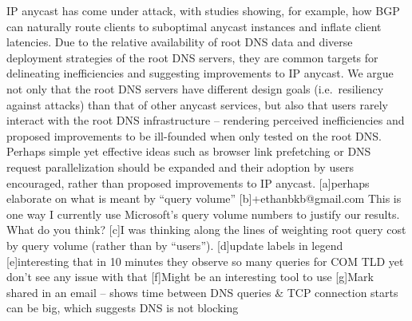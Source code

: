 \documentclass[sigconf,nonacm,10pt]{acmart}
\begin{document}
IP anycast has come under attack, with studies showing, for example, how
BGP can naturally route clients to suboptimal anycast instances and
inflate client latencies. Due to the relative availability of root DNS
data and diverse deployment strategies of the root DNS servers, they are
common targets for delineating inefficiencies and suggesting
improvements to IP anycast. We argue not only that the root DNS servers
have different design goals (i.e.~resiliency against attacks) than that
of other anycast services, but also that users rarely interact with the
root DNS infrastructure -- rendering perceived inefficiencies and
proposed improvements to be ill-founded when only tested on the root
DNS. Perhaps simple yet effective ideas such as browser link prefetching
or DNS request parallelization should be expanded and their adoption by
users encouraged, rather than proposed improvements to IP anycast.
{[}a{]}perhaps elaborate on what is meant by ``query volume''
{[}b{]}+ethanbkb@gmail.com This is one way I currently use Microsoft's
query volume numbers to justify our results. What do you think? {[}c{]}I
was thinking along the lines of weighting root query cost by query
volume (rather than by ``users''). {[}d{]}update labels in legend
{[}e{]}interesting that in 10 minutes they observe so many queries for
COM TLD yet don't see any issue with that {[}f{]}Might be an interesting
tool to use {[}g{]}Mark shared in an email -- shows time between DNS
queries \& TCP connection starts can be big, which suggests DNS is not
blocking


\end{document}
